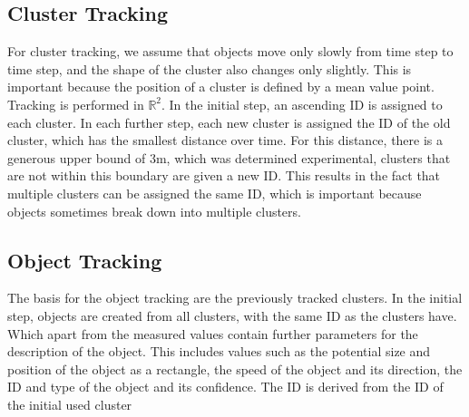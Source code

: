 \documentclass[11pt,oneside,openright]{mpreport}
\begin{document}
\subsection{Cluster Tracking}
For cluster tracking, we assume that objects move only slowly from time step to time step, and the shape of the cluster also changes only slightly. 
This is important because the position of a cluster is defined by a mean value point. Tracking is performed in $\mathbb{R}^2$. 
In the initial step, an ascending ID is assigned to each cluster.
In each further step, each new cluster is assigned the ID of the old cluster, which has the smallest distance over time.
For this distance, there is a generous upper bound of 3m, which was determined experimental, clusters that are not within this boundary are given a new ID.
This results in the fact that multiple clusters can be assigned the same ID, which is important because objects sometimes break down into multiple clusters.

\subsection{Object Tracking}
The basis for the object tracking are the previously tracked clusters. In the initial step, objects are created from all clusters, with the same ID as the clusters have.
Which apart from the measured values contain further parameters for the description of the object. This includes values such as the potential size and 
position of the object as a rectangle, the speed of the object and its direction, the ID and type of the object and its confidence. The ID is derived from the ID of the initial used cluster
\end{document}
